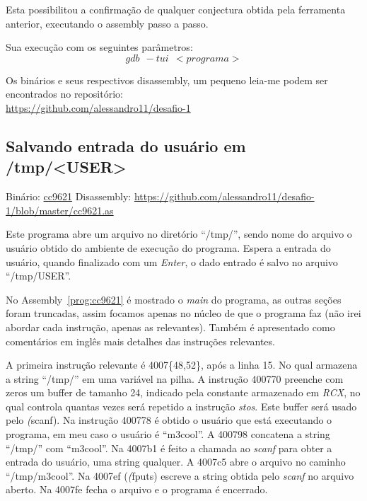 Esta possibilitou a confirmação de qualquer conjectura obtida pela
ferramenta anterior, executando o assembly passo a passo.

Sua execução com os seguintes parâmetros:
$$gdb \ \ -tui \ \ <programa>$$

Os binários e seus respectivos disassembly, um pequeno leia-me podem
ser encontrados no repositório:\\

\href{https://github.com/alessandro11/desafio-1}{https://github.com/alessandro11/desafio-1}


\subsection{Salvando entrada do usuário em /tmp/<USER>}
Binário: \href{https://s3.amazonaws.com/chaordic-desafio-cloud/cc9621}{cc9621}
Disassembly:
\href{https://github.com/alessandro11/desafio-1/blob/master/cc9621.as}{https://github.com/alessandro11/desafio-1/blob/master/cc9621.as}

Este programa abre um arquivo no diretório ``/tmp/'', sendo nome do
arquivo o usuário obtido do ambiente de execução do programa. Espera a
entrada do usuário, quando finalizado com um \emph{Enter}, o
dado entrado é salvo no arquivo ``/tmp/USER''.



No Assembly~\ref{prog:cc9621} é mostrado o \emph{main} do programa, as
outras seções foram truncadas, assim focamos apenas no núcleo de que o
programa faz (não irei abordar cada instrução, apenas as
relevantes). Também é apresentado como comentários em inglês mais
detalhes das instruções relevantes.

A primeira instrução relevante é 4007\{48,52\}, após a linha 15. No qual
armazena a string ``/tmp/'' em uma variável na pilha. A instrução
400770 preenche com zeros um buffer de tamanho 24, indicado pela
constante armazenado em \emph{RCX}, no qual controla quantas vezes será
repetido a instrução \emph{stos}. Este buffer será usado pelo
\emph(scanf). Na instrução 400778 é obtido o usuário que está
executando o programa, em meu caso o usuário é ``m3cool''. A 400798
concatena a string ``/tmp/'' com ``m3cool''. Na 4007b1 é feito a
chamada ao \emph{scanf} para obter a entrada do usuário, uma string
qualquer. A 4007c5 abre o arquivo no caminho ``/tmp/m3cool''. Na
4007ef (\emph(fputs) escreve a string obtida pelo \emph{scanf} no
arquivo aberto. Na 4007fe fecha o arquivo e o programa é encerrado.


